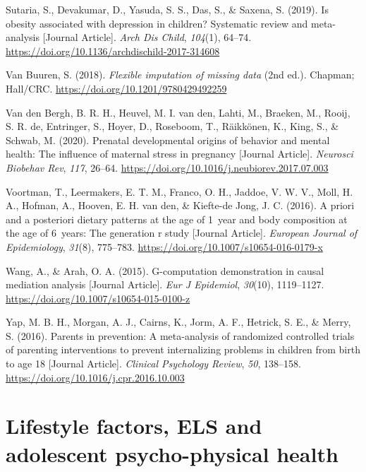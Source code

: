 \documentclass[
  letterpaper,
  DIV=11,
  numbers=noendperiod]{scrreport}
\newlength{\cslhangindent}
\newenvironment{CSLReferences}[2] %
 {\begin{list}{}{%
  \setlength{\itemindent}{0pt}
  \setlength{\leftmargin}{0pt}
  \setlength{\parsep}{0pt}
  \ifodd #1
   \setlength{\leftmargin}{\cslhangindent}
   \setlength{\itemindent}{-1\cslhangindent}
  \fi
  \setlength{\itemsep}{#2\baselineskip}}}
 {\end{list}}
\begin{document}
\begin{CSLReferences}{1}{0}
Sutaria, S., Devakumar, D., Yasuda, S. S., Das, S., \& Saxena, S.
(2019). Is obesity associated with depression in children? Systematic
review and meta-analysis {[}Journal Article{]}. \emph{Arch Dis Child},
\emph{104}(1), 64--74.
\url{https://doi.org/10.1136/archdischild-2017-314608}

Van Buuren, S. (2018). \emph{Flexible imputation of missing data} (2nd
ed.). Chapman; Hall/CRC. \url{https://doi.org/10.1201/9780429492259}

Van den Bergh, B. R. H., Heuvel, M. I. van den, Lahti, M., Braeken, M.,
Rooij, S. R. de, Entringer, S., Hoyer, D., Roseboom, T., Räikkönen, K.,
King, S., \& Schwab, M. (2020). Prenatal developmental origins of
behavior and mental health: The influence of maternal stress in
pregnancy {[}Journal Article{]}. \emph{Neurosci Biobehav Rev},
\emph{117}, 26--64.
\url{https://doi.org/10.1016/j.neubiorev.2017.07.003}

Voortman, T., Leermakers, E. T. M., Franco, O. H., Jaddoe, V. W. V.,
Moll, H. A., Hofman, A., Hooven, E. H. van den, \& Kiefte-de Jong, J. C.
(2016). A priori and a posteriori dietary patterns at the age of 1~year
and body composition at the age of 6~years: The generation r study
{[}Journal Article{]}. \emph{European Journal of Epidemiology},
\emph{31}(8), 775--783. \url{https://doi.org/10.1007/s10654-016-0179-x}

Wang, A., \& Arah, O. A. (2015). G-computation demonstration in causal
mediation analysis {[}Journal Article{]}. \emph{Eur J Epidemiol},
\emph{30}(10), 1119--1127.
\url{https://doi.org/10.1007/s10654-015-0100-z}

Yap, M. B. H., Morgan, A. J., Cairns, K., Jorm, A. F., Hetrick, S. E.,
\& Merry, S. (2016). Parents in prevention: A meta-analysis of
randomized controlled trials of parenting interventions to prevent
internalizing problems in children from birth to age 18 {[}Journal
Article{]}. \emph{Clinical Psychology Review}, \emph{50}, 138--158.
\url{https://doi.org/10.1016/j.cpr.2016.10.003}

\end{CSLReferences}

\chapter{Lifestyle factors, ELS and adolescent psycho-physical
health}\label{sec-chapter3}
\end{document}
